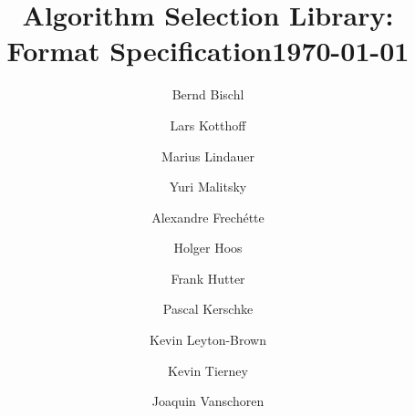 \documentclass[]{elsarticle}
\begin{document}
\title{Algorithm Selection Library: Format Specification\newline \newline \today}



\address[dortmund]{University of Dortmund; Germany}
\address[cork]{Cork Constraint Computation Centre, Ireland}
\address[freiburg]{University of Freiburg, Germany}
\address[vancouver]{University of British Columbia, Vancouver, Canada}
\address[muenster]{University of M\"unster; Germany}
\address[paderborn]{University of Paderborn, Germany}
\address[tue]{Eindhoven University of Technology, The Netherlands}

\author[dortmund]{Bernd Bischl}

\author[cork]{Lars Kotthoff}

\author[freiburg]{Marius Lindauer}

\author[cork]{Yuri Malitsky}


\author[vancouver]{Alexandre Frech\'{e}tte} 

\author[vancouver]{Holger Hoos} 

\author[freiburg]{Frank Hutter} 

\author[muenster]{Pascal Kerschke} 

\author[vancouver]{Kevin Leyton-Brown} 

\author[paderborn]{Kevin Tierney} 

\author[tue]{Joaquin Vanschoren}


\maketitle

\end{document}
